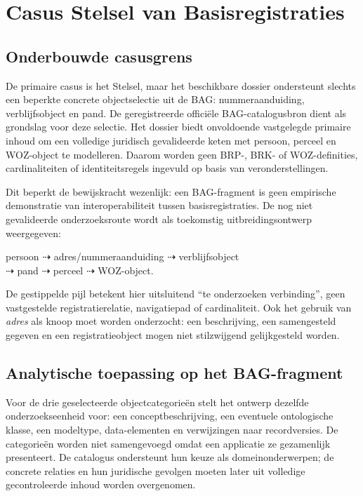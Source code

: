 \section{Casus Stelsel van Basisregistraties}
\subsection{Onderbouwde casusgrens}
De primaire casus is het Stelsel, maar het beschikbare dossier ondersteunt slechts een beperkte concrete objectselectie uit de BAG: nummeraanduiding, verblijfsobject en pand. De geregistreerde officiële BAG-catalogusbron dient als grondslag voor deze selectie. \citep{S49} Het dossier biedt onvoldoende vastgelegde primaire inhoud om een volledige juridisch gevalideerde keten met persoon, perceel en WOZ-object te modelleren. Daarom worden geen BRP-, BRK- of WOZ-definities, cardinaliteiten of identiteitsregels ingevuld op basis van veronderstellingen.

Dit beperkt de bewijskracht wezenlijk: een BAG-fragment is geen empirische demonstratie van interoperabiliteit tussen basisregistraties. De nog niet gevalideerde onderzoeksroute wordt als toekomstig uitbreidingsontwerp weergegeven:
\begin{center}
\small
persoon $\dashrightarrow$ adres/nummeraanduiding $\dashrightarrow$ verblijfsobject\\
$\dashrightarrow$ pand $\dashrightarrow$ perceel $\dashrightarrow$ WOZ-object.
\end{center}
De gestippelde pijl betekent hier uitsluitend ``te onderzoeken verbinding'', geen vastgestelde registratierelatie, navigatiepad of cardinaliteit. Ook het gebruik van \emph{adres} als knoop moet worden onderzocht: een beschrijving, een samengesteld gegeven en een registratieobject mogen niet stilzwijgend gelijkgesteld worden.

\subsection{Analytische toepassing op het BAG-fragment}
Voor de drie geselecteerde objectcategorieën stelt het ontwerp dezelfde onderzoekseenheid voor: een conceptbeschrijving, een eventuele ontologische klasse, een modeltype, data-elementen en verwijzingen naar recordversies. De categorieën worden niet samengevoegd omdat een applicatie ze gezamenlijk presenteert. De catalogus ondersteunt hun keuze als domeinonderwerpen; de concrete relaties en hun juridische gevolgen moeten later uit volledige gecontroleerde inhoud worden overgenomen. \citep{S49}

